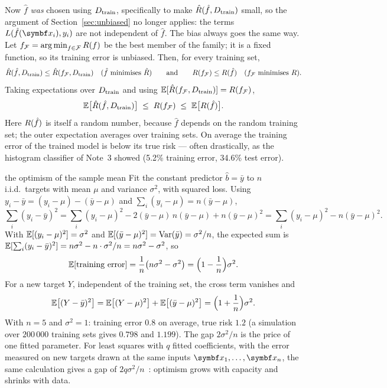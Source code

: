 \documentclass[11pt]{article}
\begin{document}
Now $\hat f$ \emph{was} chosen using $D_{\mathrm{train}}$, specifically to make $\hat R(\hat f, D_{\mathrm{train}})$ small, so the
argument of Section~\ref{sec:unbiased} no longer applies: the terms $L(\hat f(\x_i), y_i)$ are not independent of
$\hat f$. The bias always goes the same way. Let $f_{\mathcal{F}} = \operatorname*{arg\,min}_{f \in \mathcal{F}} R(f)$ be the best member of the
family; it is a fixed function, so its training error is unbiased. Then, for every training set,
\[
  \hat R(\hat f, D_{\mathrm{train}}) \le \hat R(f_{\mathcal{F}}, D_{\mathrm{train}}) \quad (\hat f \text{ minimises } \hat R)
  \qquad\text{and}\qquad
  R(f_{\mathcal{F}}) \le R(\hat f) \quad (f_{\mathcal{F}} \text{ minimises } R).
\]
Taking expectations over $D_{\mathrm{train}}$ and using $\mathbb{E}[\hat R(f_{\mathcal{F}}, D_{\mathrm{train}})] = R(f_{\mathcal{F}})$,
\[
  \mathbb{E}\big[\hat R(\hat f, D_{\mathrm{train}})\big] \;\le\; R(f_{\mathcal{F}}) \;\le\; \mathbb{E}\big[R(\hat f)\big] .
\]
Here $R(\hat f)$ is itself a random number, because $\hat f$ depends on the random training set; the outer
expectation averages over training sets. On average the training error of the trained model is below its true risk --- often drastically, as the histogram
classifier of Note~3 showed (5.2\% training error, 34.6\% test error).

\begin{worked}{the optimism of the sample mean}
Fit the constant predictor $\hat b = \bar y$ to $n$ i.i.d.\ targets with mean $\mu$ and variance $\sigma^2$, with
squared loss. Using $y_i - \bar y = (y_i - \mu) - (\bar y - \mu)$ and $\sum_i (y_i - \mu) = n(\bar y - \mu)$,
\[
  \sum_i (y_i - \bar y)^2 = \sum_i (y_i - \mu)^2 - 2(\bar y - \mu)\, n(\bar y - \mu) + n(\bar y - \mu)^2
  = \sum_i (y_i - \mu)^2 - n(\bar y - \mu)^2 .
\]
With $\mathbb{E}[(y_i - \mu)^2] = \sigma^2$ and $\mathbb{E}[(\bar y - \mu)^2] = \operatorname{Var}(\bar y) = \sigma^2/n$, the expected sum is
$\mathbb{E}[\sum_i (y_i - \bar y)^2] = n\sigma^2 - n\cdot\sigma^2/n = n\sigma^2 - \sigma^2$, so
\[
  \mathbb{E}[\text{training error}] = \frac1n\big(n\sigma^2 - \sigma^2\big) = \Big(1 - \frac1n\Big)\sigma^2 .
\]
For a new target $Y$, independent of the training set, the cross term vanishes and
\[
  \mathbb{E}\big[(Y - \bar y)^2\big] = \mathbb{E}\big[(Y - \mu)^2\big] + \mathbb{E}\big[(\bar y - \mu)^2\big] = \Big(1 + \frac1n\Big)\sigma^2 .
\]
With $n = 5$ and $\sigma^2 = 1$: training error $0.8$ on average, true risk $1.2$ (a simulation over $200\,000$
training sets gives $0.798$ and $1.199$). The gap $2\sigma^2/n$ is the price of one fitted parameter. For least
squares with $q$ fitted coefficients, with the error measured on new targets drawn at the same inputs
$\x_1, \dots, \x_n$, the same calculation gives a gap of
$2q\sigma^2/n$~\cite{hastie2009}: optimism grows with capacity and shrinks with data.
\end{worked}
\end{document}
